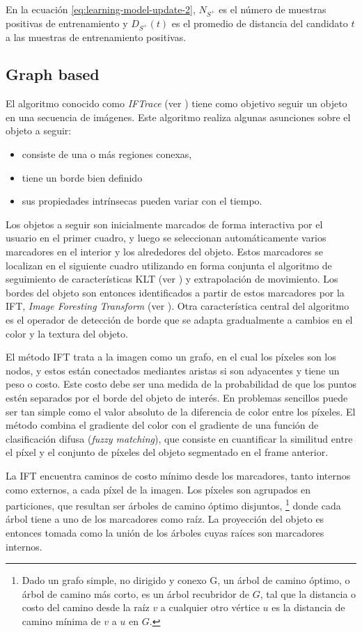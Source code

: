 En la ecuación \ref{eq:learning-model-update-2}, $N_{S^{+}}$ es el
número de muestras positivas de entrenamiento y $D_{S^{+}}(t)$
es el promedio de distancia del candidato $t$ a las muestras
de entrenamiento positivas.

\subsection{Graph based}

El algoritmo conocido como \textit{IFTrace} (ver \cite{IFTrace}) tiene como objetivo
seguir un objeto en una secuencia de imágenes. Este algoritmo realiza algunas
asunciones sobre el objeto a seguir:

\begin{itemize}
    \item consiste de una o más regiones conexas,
    \item tiene un borde bien definido
    \item sus propiedades intrínsecas pueden variar con el tiempo.
\end{itemize}

Los objetos a seguir son inicialmente marcados de forma interactiva por el
usuario en el primer cuadro, y luego se seleccionan automáticamente varios
marcadores en el interior y los alrededores del objeto. Estos marcadores se
localizan en el siguiente cuadro utilizando en forma conjunta el algoritmo de
seguimiento de características KLT (ver \cite{KLT}) y extrapolación de
movimiento. Los bordes del objeto son entonces identificados a partir de estos
marcadores por la IFT, \textit{Image Foresting Transform} (ver \cite{IFT}).
Otra característica central del algoritmo es el operador de detección de borde
que se adapta gradualmente a cambios en el color y la textura del objeto.

El método IFT trata a la imagen como un grafo, en el cual los píxeles son los
nodos, y estos están conectados mediantes aristas si son adyacentes y tiene un
peso o costo. Este costo debe ser una medida de la probabilidad de que los
puntos estén separados por el borde del objeto de interés. En problemas
sencillos puede ser tan simple como el valor absoluto de la diferencia de color
entre los píxeles. El método combina el gradiente del color con el gradiente de
una función de clasificación difusa (\textit{fuzzy matching}), que consiste en
cuantificar la similitud entre el píxel y el conjunto de píxeles del objeto
segmentado en el frame anterior.

La IFT encuentra caminos de costo mínimo desde los marcadores, tanto internos
como externos, a cada píxel de la imagen. Los píxeles son agrupados en
particiones, que resultan ser árboles de camino óptimo disjuntos,
\footnote{Dado un grafo simple, no dirigido y conexo G, un árbol de camino
  óptimo, o árbol de camino más corto, es un árbol recubridor de $G$, tal que
  la distancia o costo del camino desde la raíz $v$ a cualquier otro vértice
$u$ es la distancia de camino mínima de $v$ a $u$ en $G$.} donde cada árbol
tiene a uno de los marcadores como raíz. La proyección del objeto es entonces
tomada como la unión de los árboles cuyas raíces son marcadores internos.

